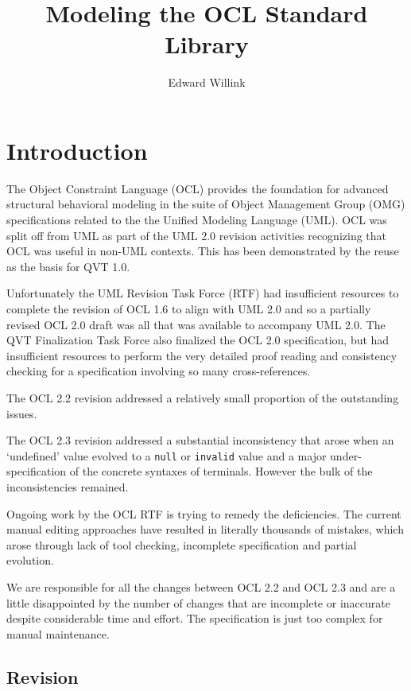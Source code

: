 \documentclass{eceasst}
\title{%
Modeling the OCL Standard Library}
\author{%
Edward Willink\autref{1}}
\institute{%
\autlabel{1} \email{ed \_at\_ willink.me.uk}, \url{http://www.eclipse.org/modeling}\\
Eclipse Modeling Project}
\begin{document}
\maketitle
\section{Introduction}

The Object Constraint Language (OCL) provides the foundation for advanced structural behavioral modeling in the suite of Object Management Group (OMG) specifications related to the the Unified Modeling Language (UML). OCL was split off from UML as part of the UML 2.0\cite{UML-2.0} revision activities recognizing that OCL was useful in non-UML contexts. This has been demonstrated by the reuse as the basis for QVT 1.0\cite{QVT-1.0}.

Unfortunately the UML Revision Task Force (RTF) had insufficient resources to complete the revision of OCL 1.6\cite{OCL-1.6} to align with UML 2.0 and so a partially revised OCL 2.0 draft\cite{OCL-2.0-draft} was all that was available to accompany UML 2.0. The QVT Finalization Task Force also finalized the OCL 2.0 specification, but had insufficient resources to perform the very detailed proof reading and consistency checking for a specification involving so many cross-references.

The OCL 2.2\cite{OCL-2.2} revision addressed a relatively small proportion of the outstanding issues.

The OCL 2.3\cite{OCL-2.3} revision addressed a substantial inconsistency that arose when an `undefined' value evolved to a \verb|null| or \verb|invalid| value and a major under-specification of the concrete syntaxes of terminals. However the bulk of the inconsistencies remained.

Ongoing work by the OCL RTF is trying to remedy the deficiencies. The current manual editing approaches have resulted in literally thousands of mistakes, which arose through lack of tool checking, incomplete specification and partial evolution.

We are responsible for all the changes between OCL 2.2 and OCL 2.3 and are a little disappointed by the number of changes that are incomplete or inaccurate despite considerable time and effort. The specification is just too complex for manual maintenance.

\subsection{Revision}
\end{document}
